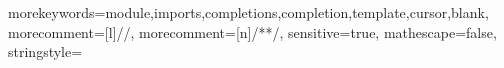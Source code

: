  {
	morekeywords={module,imports,completions,completion,template,cursor,blank},
	morecomment=[l]{//},
	morecomment=[n]{/*}{*/},
  sensitive=true,
  mathescape=false,
  stringstyle=\color{green}
}

\newcommand{\esvcode}[1]{\lstinline[language=TS,basicstyle=\lstinlinestyle,breaklines=false]{#1}}
\newcommand{\esvcodebl}[1]{\lstinline[language=TS,basicstyle=\lstinlinestyle,breaklines=true]{#1}}
\newcommand{\ESV}{\langname{ESV}}
